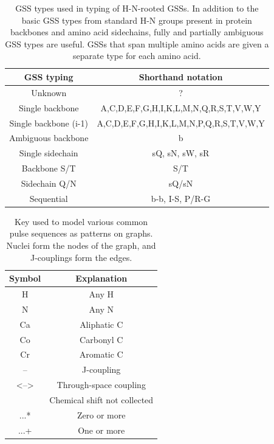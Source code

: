 \begin{table}[h]
    \begin{tabular}{ | c | c | }
    \hline
      GSS typing            &   Shorthand notation    \\ \hline
      \hline
      Unknown               &   ?                     \\ \hline
      Single backbone       &   A,C,D,E,F,G,H,I,K,L,M,N,Q,R,S,T,V,W,Y   \\ \hline
      Single backbone (i-1) &   A,C,D,E,F,G,H,I,K,L,M,N,P,Q,R,S,T,V,W,Y   \\ \hline
      Ambiguous backbone    &   b                     \\ \hline
      Single sidechain      &   sQ, sN, sW, sR        \\ \hline
      Backbone S/T          &   S/T                   \\ \hline
      Sidechain Q/N         &   sQ/sN                 \\ \hline
      Sequential            &   b-b, I-S, P/R-G       \\ \hline
    \end{tabular}
    \caption{GSS types used in typing of H-N-rooted GSSs.  In addition to the
             basic GSS types from standard H-N groups present in protein
             backbones and amino acid sidechains,
             fully and partially ambiguous GSS types are useful.  GSSs that
             span multiple amino acids are given a separate type for each
             amino acid.}
    \label{hn_gss_types}
\end{table}

\begin{table}
    \begin{tabular}{ | c | c | }
      \hline
      Symbol    &  Explanation              \\  \hline
      \hline
      H         &  Any H                    \\  \hline
      N         &  Any N                    \\  \hline
      Ca        &  Aliphatic C              \\  \hline
      Co        &  Carbonyl C               \\  \hline
      Cr        &  Aromatic C               \\  \hline
      --        &  J-coupling               \\  \hline
      <-->      &  Through-space coupling   \\  \hline
      [...]     &  Chemical shift not collected  \\  \hline
      ...*      &  Zero or more             \\  \hline
      ...+      &  One or more              \\  \hline
    \end{tabular}
    \caption{Key used to model various common pulse sequences as patterns
             on graphs.  Nuclei form the nodes of the graph, and J-couplings
             form the edges.}
    \label{pulse_sequence_key}
\end{table}

